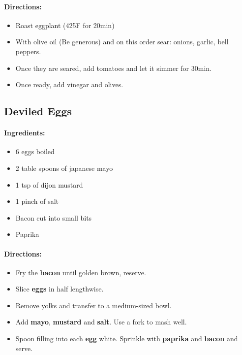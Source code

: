 \documentclass{article}
\begin{document}
\paragraph{Directions:}
\begin{itemize}
    \item Roast eggplant (425F for 20min)
    \item With olive oil (Be generous) and on this order sear: onions, garlic, bell peppers.
    \item Once they are seared, add tomatoes and let it simmer for 30min.
    \item Once ready, add vinegar and olives.
\end{itemize}

\subsection{Deviled Eggs}

\paragraph{Ingredients:}
\begin{itemize}
    \item 6 eggs boiled
    \item 2 table spoons of japanese mayo
    \item 1 tsp of dijon mustard
    \item 1 pinch of salt
    \item Bacon cut into small bits
    \item Paprika
\end{itemize}

\paragraph{Directions:}
\begin{itemize}
    \item Fry the \textbf{bacon} until golden brown, reserve.
    \item Slice \textbf{eggs} in half lengthwise.
    \item Remove yolks and transfer to a medium-sized bowl.
    \item Add \textbf{mayo}, \textbf{mustard} and \textbf{salt}. Use a fork to mash well.
    \item Spoon filling into each \textbf{egg} white. Sprinkle with \textbf{paprika} and \textbf{bacon} and serve.
\end{itemize}
\end{document}
